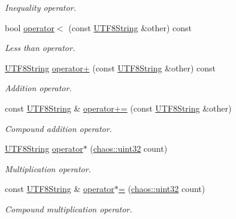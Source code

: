 \begin{DoxyCompactItemize}
\begin{DoxyCompactList}\small\item\em Inequality operator. \end{DoxyCompactList}\item 
bool \hyperlink{classchaos_1_1str_1_1_u_t_f8_string_ac7b54ed9c42a9c9a0a386d453d2c1daa}{operator$<$} (const \hyperlink{classchaos_1_1str_1_1_u_t_f8_string}{U\-T\-F8\-String} \&other) const 
\begin{DoxyCompactList}\small\item\em Less than operator. \end{DoxyCompactList}\item 
\hyperlink{classchaos_1_1str_1_1_u_t_f8_string}{U\-T\-F8\-String} \hyperlink{classchaos_1_1str_1_1_u_t_f8_string_a0d624a8e308b9a04511d31558ae37d8d}{operator+} (const \hyperlink{classchaos_1_1str_1_1_u_t_f8_string}{U\-T\-F8\-String} \&other) const 
\begin{DoxyCompactList}\small\item\em Addition operator. \end{DoxyCompactList}\item 
const \hyperlink{classchaos_1_1str_1_1_u_t_f8_string}{U\-T\-F8\-String} \& \hyperlink{classchaos_1_1str_1_1_u_t_f8_string_a9ce7f005abc581590ff3823db749873f}{operator+=} (const \hyperlink{classchaos_1_1str_1_1_u_t_f8_string}{U\-T\-F8\-String} \&other)
\begin{DoxyCompactList}\small\item\em Compound addition operator. \end{DoxyCompactList}\item 
\hyperlink{classchaos_1_1str_1_1_u_t_f8_string}{U\-T\-F8\-String} \hyperlink{classchaos_1_1str_1_1_u_t_f8_string_a8b6c57015a5e29083c74da682bc4ddac}{operator$\ast$} (\hyperlink{namespacechaos_a3b3a47ba1e284655bf1a30c441121c60}{chaos\-::uint32} count)
\begin{DoxyCompactList}\small\item\em Multiplication operator. \end{DoxyCompactList}\item 
const \hyperlink{classchaos_1_1str_1_1_u_t_f8_string}{U\-T\-F8\-String} \& \hyperlink{classchaos_1_1str_1_1_u_t_f8_string_a653dcbb095d2db19042807d03372dfbd}{operator$\ast$=} (\hyperlink{namespacechaos_a3b3a47ba1e284655bf1a30c441121c60}{chaos\-::uint32} count)
\begin{DoxyCompactList}\small\item\em Compound multiplication operator. \end{DoxyCompactList}\item 

\end{DoxyCompactItemize}
